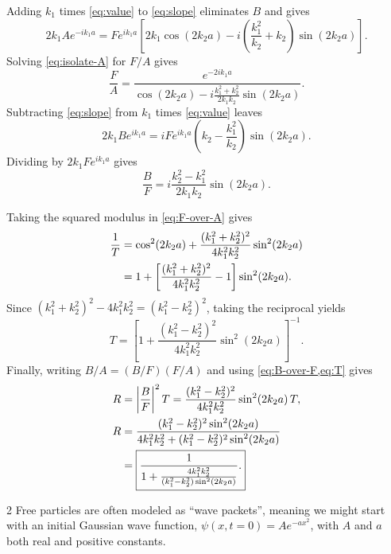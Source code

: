 \documentclass[11pt]{article}
\begin{document}
\begin{answer}
Adding \(k_1\) times \cref{eq:value} to \cref{eq:slope} eliminates \(B\)
and gives
\begin{equation}
  2k_1Ae^{-ik_1a}
  =Fe^{ik_1a}\left[2k_1\cos(2k_2a)
     -i\left(\frac{k_1^2}{k_2}+k_2\right)\sin(2k_2a)\right].
  \label{eq:isolate-A}
\end{equation}
Solving \cref{eq:isolate-A} for \(F/A\) gives
\begin{equation}
  \frac{F}{A}
  =\frac{e^{-2ik_1a}}{\displaystyle\cos(2k_2a)
    -i\frac{k_1^2+k_2^2}{2k_1k_2}\sin(2k_2a)}. \label{eq:F-over-A}
\end{equation}
Subtracting \cref{eq:slope} from \(k_1\) times \cref{eq:value} leaves
\begin{equation}
  \label{eq:isolate-B}2k_1Be^{ik_1a}
  =iFe^{ik_1a}\left(k_2-\frac{k_1^2}{k_2}\right)\sin(2k_2a).
\end{equation}
Dividing by \(2k_1Fe^{ik_1a}\) gives
\begin{equation}
  \frac{B}{F}=i\frac{k_2^2-k_1^2}{2k_1k_2}\sin(2k_2a). \label{eq:B-over-F}
\end{equation}

Taking the squared modulus in \cref{eq:F-over-A} gives
\begin{align}
  \frac{1}{T}
  &=\cos^2(2k_2a)
     +\frac{(k_1^2+k_2^2)^2}{4k_1^2k_2^2}\sin^2(2k_2a) \notag\\
  &=1+\left[\frac{(k_1^2+k_2^2)^2}{4k_1^2k_2^2}-1\right]\sin^2(2k_2a).\label{eq:inverse-T}
\end{align}
Since \((k_1^2+k_2^2)^2-4k_1^2k_2^2=(k_1^2-k_2^2)^2\), taking the
reciprocal yields
\begin{equation}
  \boxed{T=\left[1+\frac{(k_1^2-k_2^2)^2}{4k_1^2k_2^2}
    \sin^2(2k_2a)\right]^{-1}.} \label{eq:T}
\end{equation}
Finally, writing \(B/A=(B/F)(F/A)\) and using \cref{eq:B-over-F,eq:T}
gives
\begin{align}
  R &= \left|\frac{B}{F}\right|^2 T
     =\frac{(k_1^2-k_2^2)^2}{4k_1^2k_2^2}\sin^2(2k_2a)\,T,\notag\\
  R & =\frac{(k_1^2-k_2^2)^2\sin^2(2k_2a)}
      {4k_1^2k_2^2+(k_1^2-k_2^2)^2\sin^2(2k_2a)}\notag \\
  &= \boxed{\frac{1}{1 + \frac{4k_{1}^2k_2^2}{(k_1^2 - k_2^2)\sin^2(2k_2a)}}.}
      \label{eq:R}
\end{align}
\end{answer}
\begin{problem}{2}
Free particles are often modeled as “wave packets”, meaning we might start with an initial Gaussian wave function, \(\psi(x,t=0)=Ae^{-ax^2}\), with \(A\) and \(a\) both real and positive constants.
\end{problem}
\end{document}
